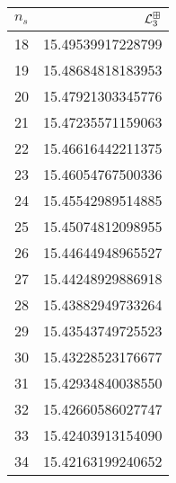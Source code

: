\begin{tabular}[t]{|lr}
\toprule
  $n_{s}$ &  $\mathcal L^{\boxplus}_3$ \\
\midrule
       18 &                   15.49539917228799 \\
       19 &                   15.48684818183953 \\
       20 &                   15.47921303345776 \\
       21 &                   15.47235571159063 \\
       22 &                   15.46616442211375 \\
       23 &                   15.46054767500336 \\
       24 &                   15.45542989514885 \\
       25 &                   15.45074812098955 \\
       26 &                   15.44644948965527 \\
       27 &                   15.44248929886918 \\
       28 &                   15.43882949733264 \\
       29 &                   15.43543749725523 \\
       30 &                   15.43228523176677 \\
       31 &                   15.42934840038550 \\
       32 &                   15.42660586027747 \\
       33 &                   15.42403913154090 \\
       34 &                   15.42163199240652 \\
\bottomrule
\end{tabular}

